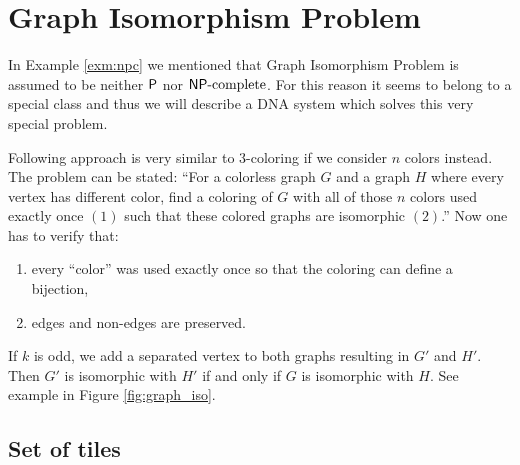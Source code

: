 \section{Graph Isomorphism Problem}

In Example \ref{exm:npc} we mentioned that Graph Isomorphism Problem is assumed to be neither $\P$ nor $\NPC$. For this reason it seems to belong to a special class and thus we will describe a DNA system which solves this very special problem.

Following approach is very similar to 3-coloring if we consider $n$ colors instead. The problem can be stated: ``For a colorless graph $G$ and a graph $H$ where every vertex has different color, find a coloring of $G$ with all of those $n$ colors used exactly once $(1)$ such that these colored graphs are isomorphic $(2)$.'' Now one has to verify that:
\begin{enumerate}
	\item every ``color'' was used exactly once so that the coloring can define a bijection,
	\item edges and non-edges are preserved.
\end{enumerate}

If $k$ is odd, we add a separated vertex to both graphs resulting in $G'$ and $H'$. Then $G'$ is isomorphic with $H'$ if and only if $G$ is isomorphic with $H$. See example in Figure \ref{fig:graph_iso}.

\subsection*{Set of tiles}

